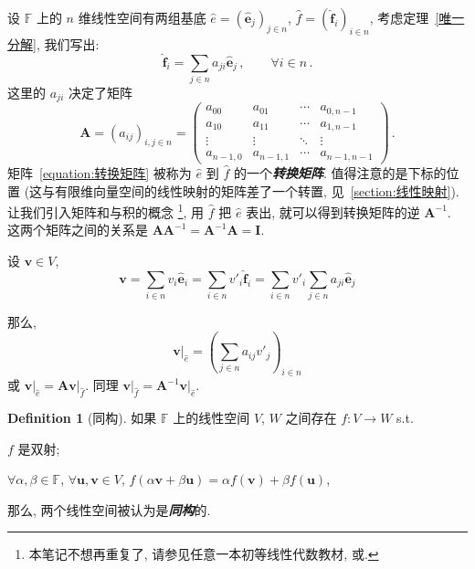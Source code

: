 \documentclass[openany]{ctexbook}
\newcommand*{\indexbf}[1]{\emph{\textbf{#1}}\index{#1}} %
\theoremstyle{plain}
\theoremstyle{definition}
\newtheorem{definition}{Definition}[section] %
\newcommand*{\basis}[1]{\hat{\boldsymbol{#1}}} %
\newcommand*{\bv}{\boldsymbol} %
\newcommand*{\inbasis}[2]{\left.%
	{#1}\right|_{#2}
}
\begin{document}
设 $\mathbb F$ 上的 $n$ 维线性空间有两组基底 $\hat e = (\basis e_j)_{j \in n}$, $\hat f = (\basis f_i)_{i \in n}$, 考虑定理~\ref{唯一分解}, 我们写出:
\begin{equation}
	\basis f_i = \sum_{j \in n} a_{ji} \basis e_j\,,
	\qquad
	\forall i \in n\,.
\end{equation}
这里的 $a_{ji}$ 决定了矩阵
\begin{equation}\label{equation:转换矩阵}
	\bv A = (a_{ij})_{i,j \in n} =
	\begin{pmatrix}
		a_{00} & a_{01} & \cdots & a_{0, n-1} \\
		a_{10} & a_{11} & \cdots & a_{1, n-1} \\
		\vdots & \vdots & \ddots & \vdots     \\
		a_{n-1, 0} & a_{n-1, 1} & \cdots & a_{n-1, n-1}
	\end{pmatrix}\,.
\end{equation}
矩阵~\eqref{equation:转换矩阵} 被称为 $\hat e$ 到 $\hat f$ 的一个\indexbf{转换矩阵}. 值得注意的是下标的位置 (这与有限维向量空间的线性映射的矩阵差了一个转置, 见~\ref{section:线性映射}). 让我们引入矩阵和与积的概念%
\footnote{本笔记不想再重复了, 请参见任意一本初等线性代数教材, 或\cite{kostrikin1982introduction}. },
用 $\hat f$ 把 $\hat e$ 表出, 就可以得到转换矩阵的逆 $\bv A^{-1}$. 
这两个矩阵之间的关系是 $\bv A \bv A^{-1} = \bv A^{-1} \bv A = \bv I$.

设 $\bv v \in V$, 
\begin{equation*}
	\bv v = \sum_{i \in n} v_i \basis e_i
	= \sum_{i \in n} v'_i \basis f_i
	= \sum_{i \in n} v'_i \sum_{j \in n} a_{ji} \basis e_j
\end{equation*}

那么, 
\begin{equation*}
	\inbasis{\bv v}{\hat e} = \left( 
		\sum_{j \in n} a_{ij} v'_j 
 \right)_{i \in n}
\end{equation*}
或 $\inbasis{\bv v}{\hat e} = \bv A \inbasis{\bv v}{\hat f}$. 同理 $\inbasis{\bv v}{\hat f} = \bv A^{-1} \inbasis{\bv v}{\hat e}$. 

\begin{definition}[同构]
	如果 $\mathbb F$ 上的线性空间 $V$, $W$ 之间存在 $f \colon V \to W$ s.t.\ 
	\begin{conditionlist}
		\item $f$ 是双射;
		\item $\forall \alpha, \beta \in \mathbb F$, $\forall \bv u, \bv v \in V$, $f(\alpha \bv v + \beta \bv u) = \alpha f(\bv v) + \beta f(\bv u)$,
	\end{conditionlist}
	那么, 两个线性空间被认为是\indexbf{同构}的.
\end{definition}
\end{document}
